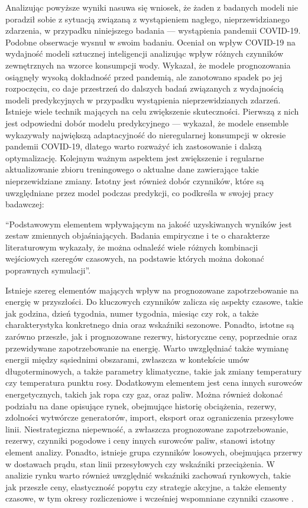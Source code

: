 \documentclass[polish, twoside, 12pt, a4paper]{article}
\theoremstyle{definition}
\theoremstyle{plain}
\theoremstyle{remark}
\begin{document}
Analizując powyższe wyniki nasuwa się wniosek, że żaden z badanych modeli nie poradził sobie z sytuacją związaną z wystąpieniem nagłego, nieprzewidzianego zdarzenia, w przypadku niniejszego badania --- wystąpienia pandemii COVID-19. Podobne obserwacje wysnuł \cite{abutalib2023} w swoim badaniu. Oceniał on wpływ COVID-19 na wydajność modeli sztucznej inteligencji analizując wpływ różnych czynników zewnętrznych na wzorce konsumpcji wody. Wykazał, że modele prognozowania osiągnęły wysoką dokładność przed pandemią, ale zanotowano spadek po jej rozpoczęciu, co daje przestrzeń do dalszych badań związanych z wydajnością modeli predykcyjnych w przypadku wystąpienia nieprzewidzianych zdarzeń. Istnieje wiele technik mających na celu zwiększenie skuteczności. Pierwszą z nich jest odpowiedni dobór modelu predykcyjnego --- \cite{abutalib2023} wykazał, że modele ensemble wykazywały największą adaptacyjność do nieregularnej konsumpcji w okresie pandemii COVID-19, dlatego warto rozważyć ich zastosowanie i dalszą optymalizację. Kolejnym ważnym aspektem jest zwiększenie i regularne aktualizowanie zbioru treningowego o aktualne dane zawierające takie nieprzewidziane zmiany. Istotny jest również dobór czynników, które są uwzględniane przez model podczas predykcji, co podkreśla \cite{jasiński2014} w swojej pracy badawczej:

\enquote{Podstawowym elementem wpływającym na jakość uzyskiwanych wyników jest zestaw zmiennych objaśniających. Badania empiryczne i te o charakterze literaturowym wykazały, że można odnaleźć wiele różnych kombinacji wejściowych szeregów czasowych, na podstawie których można dokonać poprawnych symulacji}.

Istnieje szereg elementów mających wpływ na prognozowane zapotrzebowanie na energię w przyszłości. Do kluczowych czynników zalicza się aspekty czasowe, takie jak godzina, dzień tygodnia, numer tygodnia, miesiąc czy rok, a także charakterystyka konkretnego dnia oraz wskaźniki sezonowe. Ponadto, istotne są zarówno przeszłe, jak i prognozowane rezerwy, historyczne ceny, poprzednie oraz przewidywane zapotrzebowanie na energię. Warto uwzględniać także wymianę energii między sąsiednimi obszarami, zwłaszcza w kontekście umów długoterminowych, a także parametry klimatyczne, takie jak zmiany temperatury czy temperatura punktu rosy. Dodatkowym elementem jest cena innych surowców energetycznych, takich jak ropa czy gaz, oraz paliw. Można również dokonać podziału na dane opisujące rynek, obejmujące historię obciążenia, rezerwy, zdolności wytwórcze generatorów, import, eksport oraz ograniczenia przesyłowe linii. Niestrategiczna niepewność, a zwłaszcza prognozowane zapotrzebowanie, rezerwy, czynniki pogodowe i ceny innych surowców paliw, stanowi istotny element analizy. Ponadto, istnieje grupa czynników losowych, obejmująca przerwy w dostawach prądu, stan linii przesyłowych czy wskaźniki przeciążenia. W analizie rynku warto również uwzględnić wskaźniki zachowań rynkowych, takie jak przeszłe ceny, elastyczność popytu czy strategie akcyjne, a także elementy czasowe, w tym okresy rozliczeniowe i wcześniej wspomniane czynniki czasowe \citep{nejad2011, aggarwal2009}.
\end{document}
